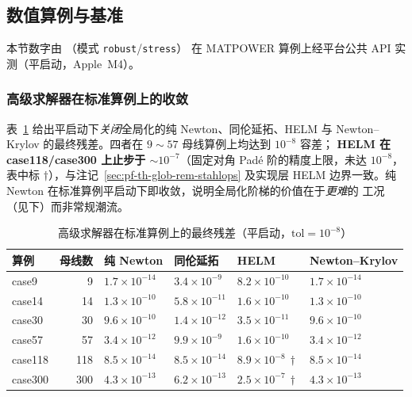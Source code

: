 \subsection{数值算例与基准}\label{sec:pf-th-glob-numexp}

本节数字由 （模式 \texttt{robust}/\texttt{stress}）
在 MATPOWER 算例上经平台公共 API 实测（平启动，Apple~M4）。

\subsubsection{高级求解器在标准算例上的收敛}
表~\ref{tab:pf-th-glob-robust} 给出平启动下\emph{关闭}全局化的纯 Newton、同伦延拓、HELM
与 Newton--Krylov 的最终残差。四者在 $9\sim57$ 母线算例上均达到 $10^{-8}$ 容差；
\textbf{HELM 在 case118/case300 上止步于 $\sim10^{-7}$}（固定对角 Padé 阶的精度上限，未达
$10^{-8}$，表中标 $\dagger$），与注记~\ref{sec:pf-th-glob-rem-stahlops} 及实现层 HELM
边界一致。纯 Newton 在标准算例平启动下即收敛，说明全局化阶梯的价值在于\emph{更难}的
工况（见下）而非常规潮流。
\begin{table}[H]\centering\footnotesize
\caption{高级求解器在标准算例上的最终残差（平启动，$\mathrm{tol}=10^{-8}$）}
\label{tab:pf-th-glob-robust}
\begin{tabular}{@{}lrllll@{}}
\toprule
算例 & 母线数 & 纯 Newton & 同伦延拓 & HELM & Newton--Krylov\\
\midrule
case9   & 9   & $1.7\times10^{-14}$ & $3.4\times10^{-9}$  & $8.2\times10^{-10}$      & $1.7\times10^{-14}$\\
case14  & 14  & $1.3\times10^{-10}$ & $5.8\times10^{-11}$ & $1.6\times10^{-10}$      & $1.3\times10^{-10}$\\
case30  & 30  & $9.6\times10^{-10}$ & $1.4\times10^{-12}$ & $3.5\times10^{-11}$      & $9.6\times10^{-10}$\\
case57  & 57  & $3.4\times10^{-12}$ & $9.9\times10^{-9}$  & $1.6\times10^{-10}$      & $3.4\times10^{-12}$\\
case118 & 118 & $8.5\times10^{-14}$ & $8.5\times10^{-14}$ & $8.9\times10^{-8}\,\dagger$ & $8.5\times10^{-14}$\\
case300 & 300 & $4.3\times10^{-13}$ & $6.2\times10^{-13}$ & $2.5\times10^{-7}\,\dagger$ & $4.3\times10^{-13}$\\
\bottomrule
\end{tabular}
\end{table}

